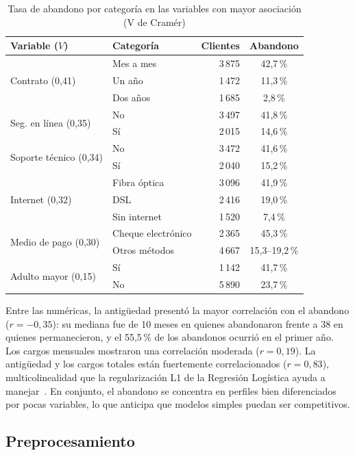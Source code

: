 \documentclass[conference]{IEEEtran}
\begin{document}
\begin{table}[!t]
\caption{Tasa de abandono por categoría en las variables con mayor asociación (V de Cramér)}
\label{tab:eda}
\centering
\footnotesize
\setlength{\tabcolsep}{4pt}
\begin{tabular}{@{}llrc@{}}
\toprule
Variable ($V$) & Categoría & Clientes & Abandono \\
\midrule
\multirow{3}{*}{Contrato (0,41)} & Mes a mes & 3\,875 & 42,7\,\% \\
 & Un año & 1\,472 & 11,3\,\% \\
 & Dos años & 1\,685 & 2,8\,\% \\
\midrule
\multirow{2}{*}{Seg. en línea (0,35)} & No & 3\,497 & 41,8\,\% \\
 & Sí & 2\,015 & 14,6\,\% \\
\midrule
\multirow{2}{*}{Soporte técnico (0,34)} & No & 3\,472 & 41,6\,\% \\
 & Sí & 2\,040 & 15,2\,\% \\
\midrule
\multirow{3}{*}{Internet (0,32)} & Fibra óptica & 3\,096 & 41,9\,\% \\
 & DSL & 2\,416 & 19,0\,\% \\
 & Sin internet & 1\,520 & 7,4\,\% \\
\midrule
\multirow{2}{*}{Medio de pago (0,30)} & Cheque electrónico & 2\,365 & 45,3\,\% \\
 & Otros métodos & 4\,667 & 15,3--19,2\,\% \\
\midrule
\multirow{2}{*}{Adulto mayor (0,15)} & Sí & 1\,142 & 41,7\,\% \\
 & No & 5\,890 & 23,7\,\% \\
\bottomrule
\end{tabular}
\end{table}

Entre las numéricas, la antigüedad presentó la mayor correlación con el abandono ($r=-0{,}35$): su mediana fue de 10 meses en quienes abandonaron frente a 38 en quienes permanecieron, y el 55,5\,\% de los abandonos ocurrió en el primer año. Los cargos mensuales mostraron una correlación moderada ($r=0{,}19$). La antigüedad y los cargos totales están fuertemente correlacionados ($r=0{,}83$), multicolinealidad que la regularización L1 de la Regresión Logística ayuda a manejar~\cite{tibshirani1996lasso}. En conjunto, el abandono se concentra en perfiles bien diferenciados por pocas variables, lo que anticipa que modelos simples puedan ser competitivos.

\subsection{Preprocesamiento}
\end{document}
